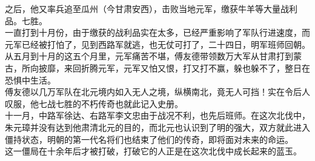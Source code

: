 \begin{multicols}{\theparacolNo}
之后，他又率兵追至瓜州（今甘肃安西），击败当地元军，缴获牛羊等大量战利品。七胜。\\

一直打到十月份，由于缴获的战利品实在太多，已经严重影响了军队行进速度，而元军已经被打怕了，见到西路军就逃，也无仗可打了，二十四日，明军班师回朝。\\

从五月到十月的这五个月里，元军痛苦不堪，傅友德带领数万大军从甘肃打到蒙古，所向披靡，来回折腾元军，元军又怕又恨，打又打不赢，躲也躲不了，整日在恐惧中生活。\\

傅友德以几万军队在北元境内如入无人之境，纵横南北，竟无人可挡！实在令后人叹服，他七战七胜的不朽传奇也就此记入史册。\\

十一月，中路军徐达、右路军李文忠由于战况不利，也先后班师。在这次北伐中，朱元璋并没有达到他肃清北元的目的，而北元也认识到了明的强大，双方就此进入僵持状态，明朝的第一代名将们也结束了他们的传奇，即将面对未来的命运。\\

这一僵局在十余年后才被打破，打破它的人正是在这次北伐中成长起来的蓝玉。\\
\ifnum{}
	\end{multicols}
\fi
\newpage
